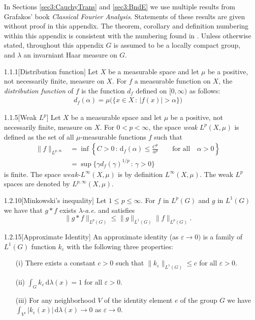 \documentclass[../dissertation.tex]{subfiles}
\begin{document}
In Sections \ref{sec3:CauchyTrans} and \ref{sec3:BndE} we use multiple results
from Grafakos' book \textit{Classical Fourier Analysis}. Statements of these 
results are given without proof in this appendix. The theorem, corollary and definition 
numbering within this appendix is consistent with the numbering found in \cite{Grafakos}.
Unless otherwise stated, throughout this appendix $G$ is assumed to be a locally
compact group, and $\lambda$ an invarniant Haar measure on $G$.


\begin{mdefn}{1.1.1}[Distribution function]
	Let $X$ be a measurable space and let $\mu$ be a positive, not necessarily 
	finite, measure on $X$. For $f$ a measurable function on $X$, the
	\textit{distribution function} of $f$ is the function $d_f$ defined 
	on $[0, \infty)$ as follows:
	\begin{align*}
		d_f(\alpha) = \mu\big(\{ x\in X\,:\,|f(x)|>\alpha \}\big)
	\end{align*}
\end{mdefn}

\begin{mdefn}{1.1.5}[Weak $L^p$]
	Let $X$ be a measurable space and let $\mu$ be a positive, not necessarily 
	finite, measure on $X$. For $0<p<\infty$, the space \textit{weak} $L^p(X, \mu)$
	is defined as the set of all $\mu$-measurable functions $f$ such that
	\begin{align*}
		\|f\|_{L^{p,\infty}} 
			&=\inf
				\left\{ 
					C>0 \,:\, \mathrm{d}_f(\alpha) \leq \frac{C^p}{\alpha^p}
					\qquad \text{for all}\quad \alpha>0
				\right\} \\
			&= \sup\{ \gamma d_f(\gamma)^{1/p} \, : \, \gamma>0 \}
	\end{align*}
	is finite. The space $weak$-$L^\infty(X, \mu)$ is by definition $L^\infty(X, \mu)$.
	The weak $L^p$ spaces are denoted by $L^{p, \infty}(X, \mu)$.\label{sym:weakLp}
\end{mdefn}


\begin{mthm}{1.2.10}[Minkowski's inequality]
	Let $1 \leq p \leq \infty$. For $f$ in $L^p(G)$ and $g$ in $L^1(G)$
	we have that $g*f$ exists $\lambda$-\textit{a.e.} and satisfies 
	\[
		\|g*f\|_{L^p(G)} \leq \|g\|_{L^1(G)} \|f\|_{L^p(G)}.
	\]
\end{mthm}

\begin{mdefn}{1.2.15}[Approximate Identity]
	An approximate identity (as $\varepsilon\to0)$ is a family of $L^1(G)$
	function $k_\varepsilon$ with the following three properties:
	\begin{itemize}
		\item[(i)] There exists a constant $c > 0$ such that 
			$\|k_\varepsilon\|_{L^1(G)} \leq c$ for all $\varepsilon > 0$.
		\item[(ii)] $\int_G k_\varepsilon \, \mathrm{d}\lambda(x) = 1$ for all $\varepsilon > 0$.
		\item[(iii)] For any neighborhood $V$ of the identity element $e$ of the group
			$G$ we have $\int_{V^c}|k_\varepsilon (x)| \, \mathrm{d}\lambda(x) \to 0$ as 
			$\varepsilon \to 0$.
	\end{itemize}
\end{mdefn}
\end{document}
